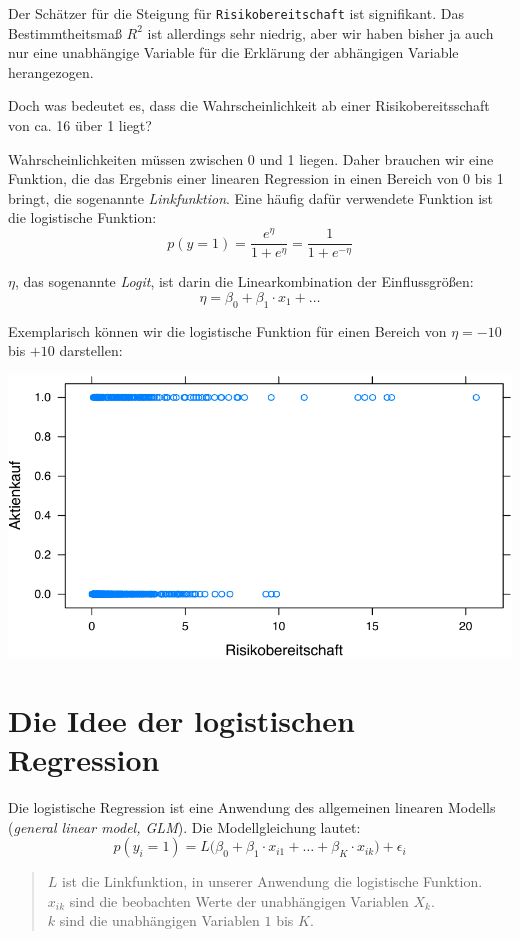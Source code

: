 \documentclass[12pt,]{book}
\begin{document}
Der Schätzer für die Steigung für \texttt{Risikobereitschaft} ist
signifikant. Das Bestimmtheitsmaß \(R^2\) ist allerdings sehr niedrig,
aber wir haben bisher ja auch nur eine unabhängige Variable für die
Erklärung der abhängigen Variable herangezogen.

Doch was bedeutet es, dass die Wahrscheinlichkeit ab einer
Risikobereitsschaft von ca. 16 über 1 liegt?

Wahrscheinlichkeiten müssen zwischen 0 und 1 liegen. Daher brauchen wir
eine Funktion, die das Ergebnis einer linearen Regression in einen
Bereich von 0 bis 1 bringt, die sogenannte \emph{Linkfunktion}. Eine
häufig dafür verwendete Funktion ist die logistische Funktion:
\[p(y=1)=\frac{e^\eta}{1+e^\eta}=\frac{1}{1+e^{-\eta}}\]

\(\eta\), das sogenannte \emph{Logit}, ist darin die Linearkombination
der Einflussgrößen: \[\eta=\beta_0+\beta_1\cdot x_1+\dots\]

Exemplarisch können wir die logistische Funktion für einen Bereich von
\(\eta=-10\) bis \(+10\) darstellen:

\begin{center}\includegraphics[width=0.7\linewidth]{072_klassifizierende_Regression_files/figure-latex/unnamed-chunk-6-1} \end{center}

\section{Die Idee der logistischen
Regression}\label{die-idee-der-logistischen-regression}

Die logistische Regression ist eine Anwendung des allgemeinen linearen
Modells (\emph{general linear model, GLM}). Die Modellgleichung lautet:
\[p(y_i=1)=L\bigl(\beta_0+\beta_1\cdot x_{i1}+\dots+\beta_K\cdot x_{ik}\bigr)+\epsilon_i\]

\begin{quote}
\(L\) ist die Linkfunktion, in unserer Anwendung die logistische
Funktion.\\
\(x_{ik}\) sind die beobachten Werte der unabhängigen Variablen
\(X_k\).\\
\(k\) sind die unabhängigen Variablen \(1\) bis \(K\).
\end{quote}
\end{document}
